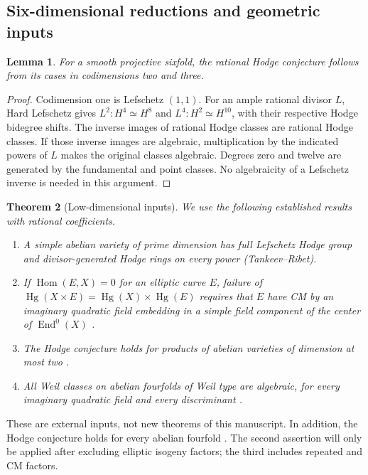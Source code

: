 \documentclass[11pt,reqno]{article}
\theoremstyle{emphasizedplain}
\theoremstyle{emphasizeddefinition}
\theoremstyle{emphasizeddefinition}
\newtheorem{prelemma}{Lemma}
\newtheorem{pretheorem}[prelemma]{Theorem}
\DeclareMathOperator{\End}{End}
\DeclareMathOperator{\Hom}{Hom}
\DeclareMathOperator{\Hg}{Hg}
\begin{document}
\subsection*{Six-dimensional reductions and geometric inputs}
\begin{prelemma}\label{p:HLsix}
For a smooth projective sixfold, the rational Hodge conjecture follows
from its cases in codimensions two and three.
\end{prelemma}
\begin{proof}
Codimension one is Lefschetz $(1,1)$. For an ample rational divisor $L$,
Hard Lefschetz gives $L^2:H^4\simeq H^8$ and $L^4:H^2\simeq H^{10}$,
with their respective Hodge bidegree shifts. The inverse images of rational
Hodge classes are rational Hodge classes. If those inverse images are
algebraic, multiplication by the indicated powers of $L$ makes the
original classes algebraic. Degrees zero and twelve are generated by the
fundamental and point classes. No algebraicity of a Lefschetz inverse is
needed in this argument.
\end{proof}
\begin{pretheorem}[Low-dimensional inputs]\label{p:lowdim}
We use the following established results with rational coefficients.
\begin{enumerate}
\item A simple abelian variety of prime dimension has full Lefschetz
Hodge group and divisor-generated Hodge rings on every power
\cite[Theorem (2.7)]{MZ} (Tankeev--Ribet).
\item If $\Hom(E,X)=0$ for an elliptic curve $E$, failure of
$\Hg(X\times E)=\Hg(X)\times\Hg(E)$ requires that $E$ have CM by an
imaginary quadratic field embedding in a simple field component of
the center of $\End^0(X)$
\cite[Proposition (3.8)]{MZ}.
\item The Hodge conjecture holds for products of abelian varieties of
dimension at most two \cite[Proposition 2.18 in the preprint]{RamonMari}.
\item All Weil classes on abelian fourfolds of Weil type are algebraic,
for every imaginary quadratic field and every discriminant
\cite[proof of Corollary 1.6.1]{Markman}.
\end{enumerate}
\end{pretheorem}
These are external inputs, not new theorems of this manuscript.
In addition, the Hodge conjecture holds for every abelian fourfold
\cite[Corollary 1.6.1]{Markman}.
The second assertion will only be applied after excluding elliptic
isogeny factors; the third includes repeated and CM factors.
\end{document}
